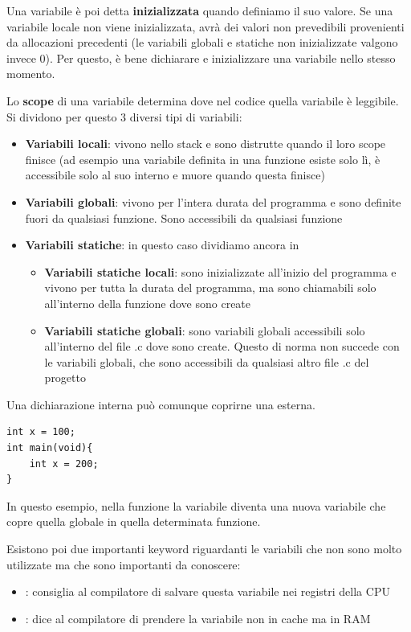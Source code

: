 \documentclass[11pt, a4paper, titlepage, oneside]{scrbook}
\begin{document}
Una variabile è poi detta \textbf{inizializzata} quando definiamo il suo valore. Se una variabile locale non viene inizializzata, avrà dei valori non prevedibili provenienti da allocazioni precedenti (le variabili globali e statiche non inizializzate valgono invece 0). Per questo, è bene dichiarare e inizializzare una variabile nello stesso momento.

\begin{Proprieta}
\label{prop-scope-variabile}
Lo \textbf{scope} di una variabile determina dove nel codice quella variabile è leggibile. Si dividono per questo 3 diversi tipi di variabili:
\begin{itemize}
    \item \textbf{Variabili locali}: vivono nello stack e sono distrutte quando il loro scope finisce (ad esempio una variabile definita in una funzione esiste solo lì, è accessibile solo al suo interno e muore quando questa finisce)
    \item \textbf{Variabili globali}: vivono per l'intera durata del programma e sono definite fuori da qualsiasi funzione. Sono accessibili da qualsiasi funzione
    \item \textbf{Variabili statiche}: in questo caso dividiamo ancora in 
    \begin{itemize}
        \item \textbf{Variabili statiche locali}: sono inizializzate all'inizio del programma e vivono per tutta la durata del programma, ma sono chiamabili solo all'interno della funzione dove sono create
        \item \textbf{Variabili statiche globali}: sono variabili globali accessibili solo all'interno del file .c dove sono create. Questo di norma non succede con le variabili globali, che sono accessibili da qualsiasi altro file .c del progetto
    \end{itemize}
\end{itemize}
\end{Proprieta}

Una dichiarazione interna può comunque coprirne una esterna.
\begin{lstlisting}[style=C]
int x = 100;
int main(void){
    int x = 200;
}
\end{lstlisting}

In questo esempio, nella funzione  la variabile  diventa una nuova variabile che copre quella globale in quella determinata funzione.

Esistono poi due importanti keyword riguardanti le variabili che non sono molto utilizzate ma che sono importanti da conoscere:
\begin{itemize}
    \item {}: consiglia al compilatore di salvare questa variabile nei registri della CPU
    \item {}: dice al compilatore di prendere la variabile non in cache ma in RAM
\end{itemize}
\end{document}
